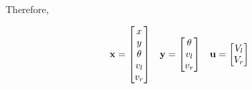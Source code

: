 Therefore,

\begin{theorem}
  \label{thm:linearized_drivetrain_model}
  \begin{equation*}
    \begin{array}{ccc}
      \mathbf{x} =
      \begin{bmatrix}
        x \\
        y \\
        \theta \\
        v_l \\
        v_r
      \end{bmatrix} &
      \mathbf{y} =
      \begin{bmatrix}
        \theta \\
        v_l \\
        v_r
      \end{bmatrix} &
      \mathbf{u} =
      \begin{bmatrix}
        V_l \\
        V_r
      \end{bmatrix}
    \end{array}
  \end{equation*}


\end{theorem}
